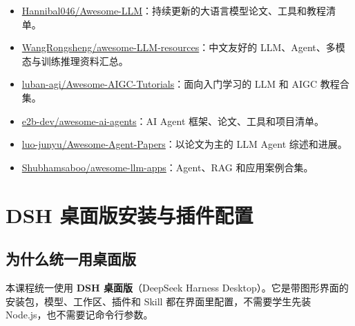\begin{itemize}
\tightlist
\item
  \href{https://github.com/Hannibal046/Awesome-LLM}{Hannibal046/Awesome-LLM}：持续更新的大语言模型论文、工具和教程清单。
\item
  \href{https://github.com/WangRongsheng/awesome-LLM-resources}{WangRongsheng/awesome-LLM-resources}：中文友好的
  LLM、Agent、多模态与训练推理资料汇总。
\item
  \href{https://github.com/luban-agi/Awesome-AIGC-Tutorials}{luban-agi/Awesome-AIGC-Tutorials}：面向入门学习的
  LLM 和 AIGC 教程合集。
\item
  \href{https://github.com/e2b-dev/awesome-ai-agents}{e2b-dev/awesome-ai-agents}：AI
  Agent 框架、论文、工具和项目清单。
\item
  \href{https://github.com/luo-junyu/Awesome-Agent-Papers}{luo-junyu/Awesome-Agent-Papers}：以论文为主的
  LLM Agent 综述和进展。
\item
  \href{https://github.com/Shubhamsaboo/awesome-llm-apps}{Shubhamsaboo/awesome-llm-apps}：Agent、RAG
  和应用案例合集。
\end{itemize}

\section{DSH
桌面版安装与插件配置}\label{dsh-ux684cux9762ux7248ux5b89ux88c5ux4e0eux63d2ux4ef6ux914dux7f6e}

\subsection{为什么统一用桌面版}\label{ux4e3aux4ec0ux4e48ux7edfux4e00ux7528ux684cux9762ux7248}

本课程统一使用 \textbf{DSH 桌面版}（DeepSeek Harness
Desktop）。它是带图形界面的安装包，模型、工作区、插件和 Skill
都在界面里配置，不需要学生先装 Node.js，也不需要记命令行参数。

